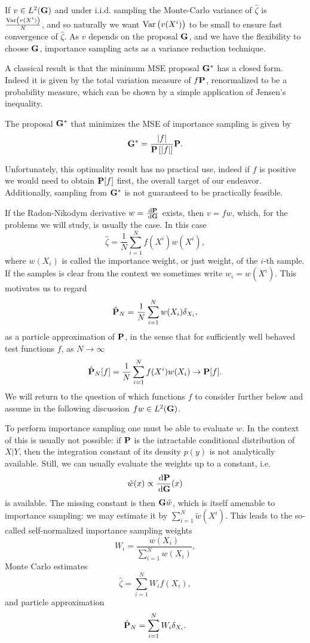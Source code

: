 If $v \in L^{2}(\G)$ and under i.i.d. sampling the Monte-Carlo variance of $\hat \zeta$ is $\frac{\var \left(v(X^{i})\right)}{N}$, and so naturally we want $\var \left(v(X^{i})\right)$ to be small to ensure fast convergence of $\hat \zeta$. As $v$ depends on the proposal $\G$, and we have the flexibility to choose $\G$, importance sampling acts as a variance reduction technique. 

A classical result is that the minimum MSE proposal $\G^\ast$ has a closed form. Indeed it is given by the total variation measure of $f\P$, renormalized to be a probability measure, which can be shown by a simple application of Jensen's inequality. 
\begin{proposition}
    \label{prop:minimum_MSE_IS}
    The proposal $\G^{\ast}$ that minimizes the MSE of importance sampling is given by
    $$
    \G^{\ast}  = \frac{\lvert f \rvert}{\P\left[\lvert f \rvert \right]} \P.
    $$
\end{proposition}
Unfortunately, this optimality result has no practical use, indeed if $f$ is positive we would need to obtain $\P[f]$ first, the overall target of our endeavor. Additionally, sampling from $\G^{\ast}$ is not guaranteed to be practically feasible. 

If the Radon-Nikodym derivative $w = \frac{\d\P}{\d\G}$ exists, then $v = fw$, which, for the problems we will study, is usually the case. In this case 
$$
\hat \zeta = \frac{1}{N} \sum_{i = 1}^N f(X^{i})w(X^{i}),
$$
where $w(X_{i})$ is called the importance weight, or just weight, of the $i$-th sample. If the samples is clear from the context we sometimes write $w_{i} = w(X^{i})$. 
This motivates us to regard
\begin{align}
\label{eq:is-particle-approximation}
\hat \P_N = \frac{1}{N} \sum_{i = 1}^{N} w(X_i) \delta_{X_i},
\end{align}
as a particle approximation of $\P$, in the sense that for sufficiently well behaved test functions $f$, as $N \to \infty$ $$
\hat\P_{N}[f] = \frac{1}{N} \sum_{i = 1}^N f(X^{i})w(X_{i})\to \P [f].
$$
We will return to the question of which functions $f$ to consider further below and assume in the following discussion $fw \in L^{2}(\G)$.

To perform importance sampling one must be able to evaluate $w$. In the context of  this is usually not possible: if $\P$ is the intractable conditional distribution of $X|Y$, then the integration constant of its density $p(y)$ is not analytically available.
Still, we can usually evaluate the weights up to a constant, i.e. $$\tilde w(x) \propto \frac{\d \P}{\d \G}(x)$$ is available. The missing constant is then $\G \tilde w$, which is itself amenable to importance sampling: we may estimate it by $\sum_{i = 1}^N \tilde w(X^{i})$.
This leads to the so-called self-normalized importance sampling weights 
$$W_i = \frac{w(X_i)}{\sum_{i = 1}^N w(X_i)},$$
Monte Carlo estimates 
$$\hat \zeta = \sum_{i = 1}^{N} W_i f(X_i),$$
and particle approximation 
$$\hat \P_N = \sum_{i = 1}^{N} W_i \delta_{X_i}.$$

